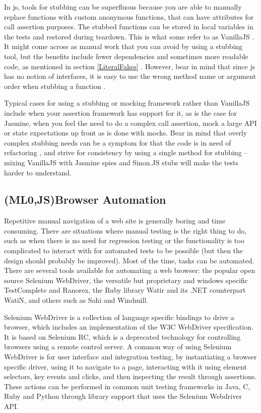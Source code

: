 \documentclass[11pt]{article}
\begin{document}
In \gls{js}, tools for stubbing can be superfluous because you are able to manually replace functions with custom anonymous functions, that can have attributes for call assertion purposes. The stubbed functions can be stored in local variables in the tests and restored during teardown. This is what some refer to as VanillaJS \cite[question~53]{Edelstam}. It might come across as manual work that you can avoid by using a stubbing tool, but the benefits include fewer dependencies and sometimes more readable code, as mentioned in section \ref{LiteralFakes} \cite[questions~54-55]{Edelstam}. However, bear in mind that since \gls{js} has no notion of interfaces, it is easy to use the wrong method name or argument order when stubbing a function \cite[p.~471]{Tddjs}.

Typical cases for using a stubbing or mocking framework rather than VanillaJS include when your assertion framework has support for it, as is the case for Jasmine, when you feel the need to do a complex call assertion, mock a large API or state expectations up front as is done with mocks. Bear in mind that overly complex stubbing needs can be a symptom for that the code is in need of refactoring \cite[question~34]{Stenmark}, and strive for consistency by using a single method for stubbing -- mixing VanillaJS with Jasmine spies and Sinon.JS stubs will make the tests harder to understand.

\subsection{(ML0,JS)Browser Automation}
\label{subsec:browserautomation}

Repetitive manual navigation of a web site is generally boring and time consuming. There are situations where manual testing is the right thing to do, such as when there is no need for regression testing or the functionality is too complicated to interact with for automated tests to be possible (but then the design should probably be improved). Most of the time, tasks can be automated. There are several tools available for automating a web browser: the popular open source Selenium WebDriver, the versatile but proprietary and windows specific TestComplete and Ranorex, the Ruby library Watir and its .NET counterpart WatiN, and others such as Sahi and Windmill.

Selenium WebDriver is a collection of language specific bindings to drive a browser, which includes an implementation of the W3C WebDriver specification. It is based on Selenium RC, which is a deprecated technology for controlling browsers using a remote control server. A common way of using Selenium WebDriver is for user interface and integration testing, by instantiating a browser specific driver, using it to navigate to a page, interacting with it using element selectors, key events and clicks, and then inspecting the result through assertions. These actions can be performed in common unit testing frameworks in Java, C\nolinebreak\hspace{-.05em}\raisebox{.3ex}{\scriptsize\bf \#}, Ruby and Python through library support that uses the Selenium Webdriver API. \cite{Selenium}
\end{document}
